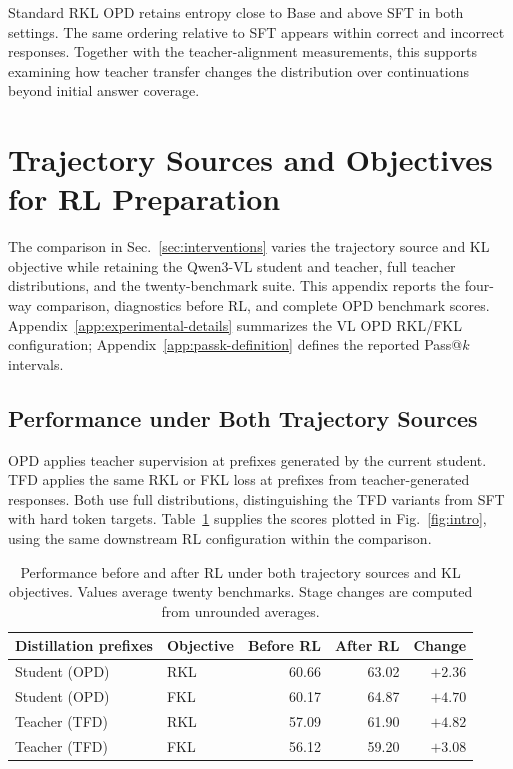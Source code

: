 \documentclass[]{jingdong}
\theoremstyle{plain}
\theoremstyle{definition}
\theoremstyle{remark}
\begin{document}
Standard RKL OPD retains entropy close to Base and above SFT in both settings. The same ordering relative to SFT appears within correct and incorrect responses. Together with the teacher-alignment measurements, this supports examining how teacher transfer changes the distribution over continuations beyond initial answer coverage.

\clearpage
\section{Trajectory Sources and Objectives for RL Preparation}
\label{app:ablations}

The comparison in Sec.~\ref{sec:interventions} varies the trajectory source and KL objective while retaining the Qwen3-VL student and teacher, full teacher distributions, and the twenty-benchmark suite. This appendix reports the four-way comparison, diagnostics before RL, and complete OPD benchmark scores. Appendix~\ref{app:experimental-details} summarizes the VL OPD RKL/FKL configuration; Appendix~\ref{app:passk-definition} defines the reported Pass@$k$ intervals.

\subsection{Performance under Both Trajectory Sources}
\label{app:source-objective}

OPD applies teacher supervision at prefixes generated by the current student. TFD applies the same RKL or FKL loss at prefixes from teacher-generated responses. Both use full distributions, distinguishing the TFD variants from SFT with hard token targets. Table~\ref{tab:app-source-objective} supplies the scores plotted in Fig.~\ref{fig:intro}, using the same downstream RL configuration within the comparison.

\begin{table}[H]
\centering
\small
\caption{Performance before and after RL under both trajectory sources and KL objectives. Values average twenty benchmarks. Stage changes are computed from unrounded averages.}
\label{tab:app-source-objective}
\setlength{\tabcolsep}{4pt}
\begin{tabular*}{\linewidth}{@{\extracolsep{\fill}}llrrr@{}}
\toprule
Distillation prefixes & Objective & Before RL & After RL & Change \\
\midrule
Student (OPD) & RKL & 60.66 & 63.02 & $+2.36$ \\
Student (OPD) & FKL & 60.17 & 64.87 & $+4.70$ \\
Teacher (TFD) & RKL & 57.09 & 61.90 & $+4.82$ \\
Teacher (TFD) & FKL & 56.12 & 59.20 & $+3.08$ \\
\bottomrule
\end{tabular*}
\end{table}
\end{document}
